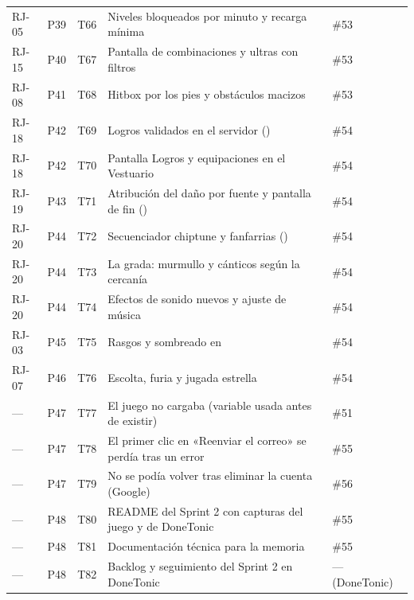 {\begin{longtable}{@{}L{1.5cm} L{0.8cm} L{1.3cm} L{7.0cm} L{2.9cm}@{}}
RJ-05 & P39 & T66 & Niveles bloqueados por minuto y recarga mínima & \#53 \\
RJ-15 & P40 & T67 & Pantalla de combinaciones y ultras con filtros & \#53 \\
RJ-08 & P41 & T68 & Hitbox por los pies y obstáculos macizos & \#53 \\
RJ-18 & P42 & T69 & Logros validados en el servidor () & \#54 \\
RJ-18 & P42 & T70 & Pantalla Logros y equipaciones en el Vestuario & \#54 \\
RJ-19 & P43 & T71 & Atribución del daño por fuente y pantalla de fin () & \#54 \\
RJ-20 & P44 & T72 & Secuenciador chiptune y fanfarrias () & \#54 \\
RJ-20 & P44 & T73 & La grada: murmullo y cánticos según la cercanía & \#54 \\
RJ-20 & P44 & T74 & Efectos de sonido nuevos y ajuste de música & \#54 \\
RJ-03 & P45 & T75 & Rasgos y sombreado en  & \#54 \\
RJ-07 & P46 & T76 & Escolta, furia y jugada estrella & \#54 \\
— & P47 & T77 & El juego no cargaba (variable usada antes de existir) & \#51 \\
— & P47 & T78 & El primer clic en «Reenviar\allowbreak{} el correo» se perdía tras un error & \#55 \\
— & P47 & T79 & No se podía volver tras eliminar la cuenta (Google) & \#56 \\
— & P48 & T80 & README del Sprint 2 con capturas del juego y de DoneTonic & \#55 \\
— & P48 & T81 & Documentación técnica para la memoria & \#55 \\
— & P48 & T82 & Backlog y seguimiento del Sprint 2 en DoneTonic & — (DoneTonic) \\*
\bottomrule
\end{longtable}
}
